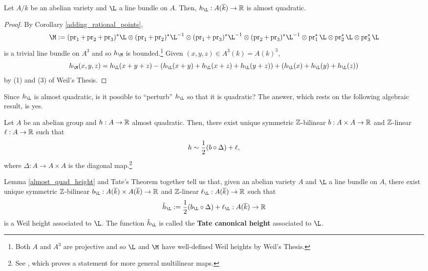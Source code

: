 \documentclass[11pt]{article}
\begin{document}
\begin{lemma}\label{almost_quad_height}
Let $A/k$ be an abelian variety and $\L$ a line bundle on $A$. Then, $h_{\L}: A(\ov{k})\to\R$ is almost quadratic.
\end{lemma}

\begin{proof}
By Corollary \ref{adding_rational_points}, 
\begin{equation*}
\M
:=(\pr_1+\pr_2+\pr_3)^*\L
\tensor(\pr_1+\pr_2)^*\L^{-1}\tensor(\pr_1+\pr_3)^*\L^{-1}\tensor(\pr_2+\pr_3)^*\L^{-1}
\tensor\pr_1^*\L\tensor\pr_2^*\L\tensor\pr_3^*\L
\end{equation*}
is a trivial line bundle on $A^3$ and so $h_{\M}$ is bounded.\footnote{Both $A$ and $A^3$ are projective and so $\L$ and $\M$ have well-defined Weil heights by Weil's Thesis.} Given $(x,y,z)\in A^3(k)=A(k)^3$,
$$h_{\M}(x,y,z)=h_{\L}(x+y+z)-(h_{\L}(x+y)+h_{\L}(x+z)+h_{\L}(y+z))+(h_{\L}(x)+h_{\L}(y)+h_{\L}(z))$$
by \textrm{(1)} and \textrm{(3)} of Weil's Thesis.
\end{proof}

Since $h_{\L}$ is almost quadratic, is it possible to ``perturb'' $h_{\L}$ so that it is quadratic? The answer, which rests on the following algebraic result, is yes.

\begin{theorem}[Tate]\label{Tate_Canonical_Height_Thm}
Let $A$ be an abelian group and $h: A\to\mathbb{R}$ almost quadratic. Then, there exist unique symmetric $\mathbb{Z}$-bilinear $b: A\times A\to\mathbb{R}$ and $\mathbb{Z}$-linear $\ell: A\to\mathbb{R}$ such that 
$$h\sim\dfrac{1}{2}(b\circ\Delta)+\ell,$$
where $\Delta: A\to A\times A$ is the diagonal map.\footnote{See \cite[\textrm{Thm 10.3.6}]{Conrad}, which proves a statement for more general multilinear maps.}
\end{theorem}

Lemma \ref{almost_quad_height} and Tate's Theorem together tell us that, given an abelian variety $A$ and $\L$ a line bundle on $A$, there exist unique symmetric $\mathbb{Z}$-bilinear $b_{\L}: A(\ov{k})\times A(\ov{k})\to\R$ and $\mathbb{Z}$-linear $\l_{\L}: A(\ov{k})\to\R$ such that 
$$\hat{h}_{\L}:=\df{1}{2}(b_{\L}\circ\Delta)+\l_{\L}: A(\ov{k})\to\R$$ 
is a Weil height associated to $\L$. The function $\hat{h}_{\L}$ is called the \textbf{Tate canonical height} associated to $\L$. 
\end{document}
